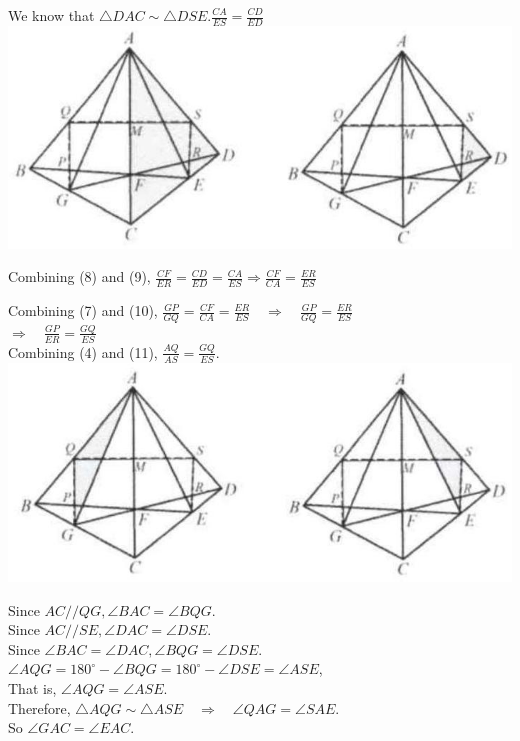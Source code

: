 \documentclass[10pt]{article}
\begin{document}
We know that \(\triangle D A C \sim \triangle D S E . \frac{C A}{E S}=\frac{C D}{E D}\)\\
\includegraphics[max width=\textwidth, center]{2025_04_17_97bc1f7e44d93c271a88g-144}

Combining (8) and (9), \(\frac{C F}{E R}=\frac{C D}{E D}=\frac{C A}{E S} \Rightarrow \frac{C F}{C A}=\frac{E R}{E S}\)

Combining (7) and (10), \(\frac{G P}{G Q}=\frac{C F}{C A}=\frac{E R}{E S} \quad \Rightarrow \quad \frac{G P}{G Q}=\frac{E R}{E S}\)\\
\(\Rightarrow \quad \frac{G P}{E R}=\frac{G Q}{E S}\)\\
Combining (4) and (11), \(\frac{A Q}{A S}=\frac{G Q}{E S}\).\\
\includegraphics[max width=\textwidth, center]{2025_04_17_97bc1f7e44d93c271a88g-145}

Since \(A C / / Q G, \angle B A C=\angle B Q G\).\\
Since \(A C / / S E, \angle D A C=\angle D S E\).\\
Since \(\angle B A C=\angle D A C, \angle B Q G=\angle D S E\).\\
\(\angle A Q G=180^{\circ}-\angle B Q G=180^{\circ}-\angle D S E=\angle A S E\),\\
That is, \(\angle A Q G=\angle A S E\).\\
Therefore, \(\triangle A Q G \sim \triangle A S E \quad \Rightarrow \quad \angle Q A G=\angle S A E\).\\
So \(\angle G A C=\angle E A C\).
\end{document}
